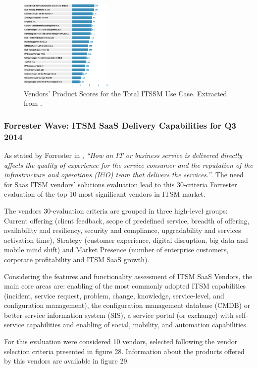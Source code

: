 \begin{figure}[!h]
\centering
\includegraphics[width=0.40\textwidth]{img/TotalITSMScores.png}
\caption{Vendors' Product Scores for the Total ITSSM Use Case. Extracted from \cite{criticalCapabilitiesITSM}.}
\end{figure}


\subsubsection{Forrester Wave: ITSM SaaS Delivery Capabilities for Q3 2014}

As stated by Forrester in \cite{forresterWaveITSM}, \textit{``How an IT or business service is delivered directly affects the quality of experience for the service consumer and the reputation of the infrastructure and operations (I\&O) team that delivers the services.''}. The need for Saas ITSM vendors' solutions evaluation lead to this 30-criteria Forrester evaluation of the top 10 most significant vendors in ITSM market.\par

The vendors 30-evaluation criteria are grouped in three high-level groups: Current offering (client feedback, scope of predefined service, breadth of offering, availability and resiliency, security and compliance, upgradability and services activation time), Strategy (customer experience, digital disruption, big data and mobile mind shift) and Market Presence (number of enterprise customers, corporate profitability and ITSM SaaS growth).\par
Considering the features and functionality assessment of ITSM SaaS Vendors, the main core areas are: enabling of the most commonly adopted ITSM capabilities (incident, service request, problem, change, knowledge, service-level, and configuration management), the configuration management database (CMDB) or better service information system (SIS), a service portal (or exchange) with self-service capabilities and enabling of social, mobility, and automation capabilities.\par
For this evaluation were considered 10 vendors, selected following the vendor selection criteria presented in figure 28. Information about the products offered by this vendors are available in figure 29.\par

